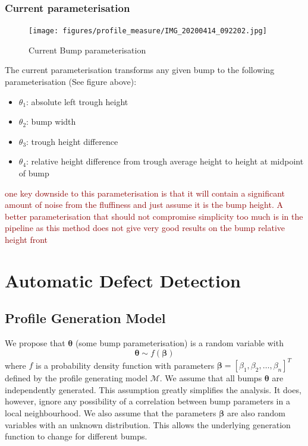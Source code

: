 \documentclass[12pt]{report}
\newcommand{\tcr}[1]{\textcolor{darkRed}{#1}}
\begin{document}
        \subsection{Current parameterisation}
            \begin{figure}
                \centering
                \texttt{[image: figures/profile\_measure/IMG\_20200414\_092202.jpg]}
                \caption{Current Bump parameterisation}
            \end{figure}
            The current parameterisation transforms any given bump to the following parameterisation (See figure above):
            \begin{itemize}
                \item $\theta_1$: absolute left trough height
                \item $\theta_2$: bump width
                \item $\theta_3$: trough height difference
                \item $\theta_4$: relative height difference from trough average height to height at midpoint of bump 
            \end{itemize}
            \tcr{one key downside to this parameterisation is that it will contain a significant amount of noise from the fluffiness and just assume it is the bump height. A better parameterisation that should not compromise simplicity too much is in the pipeline as this method does not give very good results on the bump relative height front}

\chapter{Automatic Defect Detection}
    \section{Profile Generation Model}
        We propose that $\pmb{\theta}$ (some bump parameterisation) is a random variable with
            \[ \pmb{\theta} \sim f(\pmb{\beta}) \]
        where $f$ is a probability density function with parameters $\pmb{\beta} = [\beta_1,\beta_2,\ldots,\beta_n]^T$ defined by the profile generating model $\mathcal{M}$.
        We assume that all bumps $\pmb{\theta}$ are independently generated. This assumption greatly simplifies the analysis. It does, however, ignore any possibility of a correlation between bump parameters in a local neighbourhood. We also assume that the parameters $\pmb{\beta}$ are also random variables with an unknown distribution. This allows the underlying generation function to change for different bumps.
        
\end{document}
